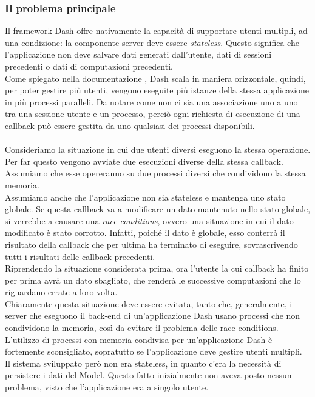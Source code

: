 \subsubsection{Il problema principale}
Il framework Dash offre nativamente la capacità di supportare utenti multipli, ad una condizione: la componente server deve essere \textit{stateless}. Questo significa che l'applicazione non deve salvare dati generati dall'utente, dati di sessioni precedenti o dati di computazioni precedenti. 
\\
Come spiegato nella documentazione \cite{site:dash-stateless}, Dash scala in maniera orizzontale, quindi, per poter gestire più utenti, vengono eseguite più istanze della stessa applicazione in più processi paralleli. Da notare come non ci sia una associazione uno a uno tra una sessione utente e un processo, perciò ogni richiesta di esecuzione di una callback può essere gestita da uno qualsiasi dei processi disponibili.
\\ \\
Consideriamo la situazione in cui due utenti diversi eseguono la stessa operazione. Per far questo vengono avviate due esecuzioni diverse della stessa callback. Assumiamo che esse opereranno su due processi diversi che condividono la stessa memoria. 
\\
Assumiamo anche che l'applicazione non sia stateless e mantenga uno stato globale. Se questa callback va a modificare un dato mantenuto nello stato globale, si verrebbe a causare una \textit{race conditions}, ovvero una situazione in cui il dato modificato è stato corrotto. Infatti, poiché il dato è globale, esso conterrà il risultato della callback che per ultima ha terminato di eseguire, sovrascrivendo tutti i risultati delle callback precedenti.
\\
Riprendendo la situazione considerata prima, ora l'utente la cui callback ha finito per prima avrà un dato sbagliato, che renderà le successive computazioni che lo riguardano errate a loro volta.
\\
Chiaramente questa situazione deve essere evitata, tanto che, generalmente, i server che eseguono il back-end di un'applicazione Dash usano processi che non condividono la memoria, così da evitare il problema delle race conditions. 
L'utilizzo di processi con memoria condivisa per un'applicazione Dash è fortemente sconsigliato, sopratutto se l'applicazione deve gestire utenti multipli.
\\
Il sistema sviluppato però non era stateless, in quanto c'era la necessità di persistere i dati del Model. Questo fatto inizialmente non aveva posto nessun problema, visto che l'applicazione era a singolo utente.

